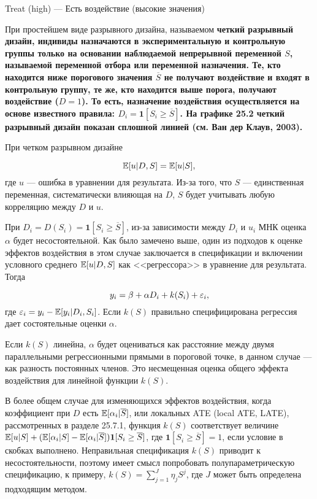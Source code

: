 Treat (high) --- Есть воздействие (высокие значения)


При простейшем виде разрывного дизайна, называемом \bfseries четкий разрывный дизайн, \mdseries индивиды назначаются в экспериментальную и контрольную группы только на основании наблюдаемой непрерывной переменной $S$, называемой переменной отбора или переменной назначения. Те, кто находится ниже порогового значения $\overline{S}$ не получают воздействие и входят в контрольную группу, те же, кто находится выше порога, получают воздействие ($D = 1$). То есть, назначение  воздействия осуществляется на основе известного правила: $D_i = \boldsymbol{1} [S_i \ge \overline{S}]$. На графике 25.2 четкий разрывный дизайн показан сплошной линией (см. Ван дер Клаув, 2003).

При четком разрывном дизайне

\begin{equation}
\label{eq25.56}
\mathbb{E}[u | D, S] = \mathbb{E} [u | S],
\end{equation}
где $u$ --- ошибка в уравнении для результата. Из-за того, что $S$ --- единственная переменная, систематически влияющая на $D$, $S$ будет учитывать любую корреляцию между $D$ и $u$. 

При $D_i = D(S_i) = \boldsymbol{1} [S_i \ge \overline{S}]$, из-за зависимости между $D_i$ и $u_i$ МНК оценка $\alpha$ будет несостоятельной. Как было замечено выше, один из подходов к оценке эффектов воздействия в этом случае заключается в спецификации и включении условного среднего $\mathbb{E}[u|D,S]$ как <<регрессора>> в уравнение для результата. Тогда

\begin{equation}
\label{eq25.57}
y_i = \beta + \alpha D_i + k (S_i) + \varepsilon_i ,
\end{equation}
где $\varepsilon_i = y_i - \mathbb{E} [y_i | D_i, S_i ] $. Если $k (S)$ правильно специфицирована регрессия дает состоятельные оценки $\alpha$. 

Если $k(S)$ линейна, $\alpha$ будет оцениваться как расстояние между двумя параллельными  регрессионными прямыми в пороговой точке, в данном случае --- как разность постоянных членов. Это несмещенная оценка общего эффекта воздействия для линейной  функции $k(S)$. 

В более общем случае для изменяющихся эффектов воздействия, когда коэффициент при $D$ есть $\mathbb{E}[\alpha_i | \overline{S}]$, или локальных ATE (local ATE, LATE), рассмотренных в разделе 25.7.1, функция $k(S)$ соответствует величине $\mathbb{E}[u|S] + (\mathbb{E}[\alpha_i | S] - \mathbb{E}[\alpha_i | \overline{S} ]) \boldsymbol{1} [S_i \ge \overline{S}]$, где $\boldsymbol{1} [S_i \ge \overline{S}] = 1$, если условие в скобках выполнено. Неправильная спецификация $k(S)$ приводит к несостоятельности, поэтому имеет смысл попробовать полупараметрическую спецификацию, к примеру, $k(S) = \sum_{j=1}^J \eta_j S^j$, где $J$ может быть определена подходящим методом. 


